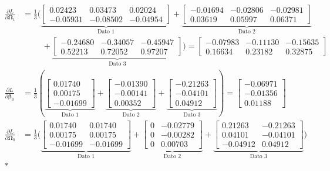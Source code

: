 \documentclass[10pt,a4paper]{article}
\begin{document}
{\begin{align*}
\frac{\partial L}{\partial \boldsymbol{\Omega}_1} &= \frac{1}{3}\Bigg( \underbrace{\begin{bmatrix} 0.02423 & 0.03473 & 0.02024 \\ -0.05931 & -0.08502 & -0.04954 \end{bmatrix}}_{\text{Dato 1}} + \underbrace{\begin{bmatrix} -0.01694 & -0.02806 & -0.02981 \\ 0.03619 & 0.05997 & 0.06371 \end{bmatrix}}_{\text{Dato 2}} \\
&\hspace{1cm} + \underbrace{\begin{bmatrix} -0.24680 & -0.34057 & -0.45947 \\ 0.52213 & 0.72052 & 0.97207 \end{bmatrix}}_{\text{Dato 3}} \Bigg) = \mathbf{\begin{bmatrix} -0.07983 & -0.11130 & -0.15635 \\ 0.16634 & 0.23182 & 0.32875 \end{bmatrix}} \\
\frac{\partial L}{\partial \boldsymbol{\beta}_0} &= \frac{1}{3}\left( \underbrace{\begin{bmatrix} 0.01740 \\ 0.00175 \\ -0.01699 \end{bmatrix}}_{\text{Dato 1}} + \underbrace{\begin{bmatrix} -0.01390 \\ -0.00141 \\ 0.00352 \end{bmatrix}}_{\text{Dato 2}} + \underbrace{\begin{bmatrix} -0.21263 \\ -0.04101 \\ 0.04912 \end{bmatrix}}_{\text{Dato 3}} \right) = \mathbf{\begin{bmatrix} -0.06971 \\ -0.01356 \\ 0.01188 \end{bmatrix}} \\
\frac{\partial L}{\partial \boldsymbol{\Omega}_0} &= \frac{1}{3}\Bigg( \underbrace{\begin{bmatrix} 0.01740 & 0.01740 \\ 0.00175 & 0.00175 \\ -0.01699 & -0.01699 \end{bmatrix}}_{\text{Dato 1}} + \underbrace{\begin{bmatrix} 0 & -0.02779 \\ 0 & -0.00282 \\ 0 & 0.00703 \end{bmatrix}}_{\text{Dato 2}} + \underbrace{\begin{bmatrix} 0.21263 & -0.21263 \\ 0.04101 & -0.04101 \\ -0.04912 & 0.04912 \end{bmatrix}}_{\text{Dato 3}} \Bigg) \\*

\end{align*}}
\end{document}
